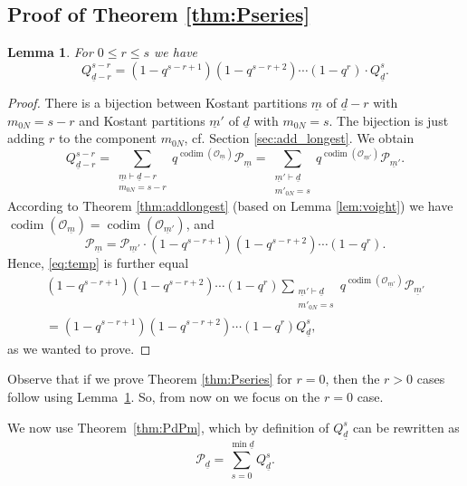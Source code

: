 \documentclass[a4paper]{amsart}
\DeclareMathOperator{\codim}{\mathrm{codim}}
\newcommand{\CO}{\mathcal{O}}
\newcommand{\CP}{\mathcal{P}}
\newcommand{\um}{\underline{m}}
\newcommand{\ud}{\underline{d}}
\newtheorem{lemma}[thm]{Lemma}
\theoremstyle{plain}
\begin{document}
\subsection{Proof of Theorem \ref{thm:Pseries}}
\label{sec:Pseries_proof}

\begin{lemma}\label{lem:shift}
For $0\leq r\leq s$ we have
\[
Q_{\ud-r}^{s-r}= (1-q^{s-r+1})(1-q^{s-r+2})\cdots (1-q^{r}) \cdot Q_{\ud}^{s}.
\]
\end{lemma}

\begin{proof}
There is a bijection between Kostant partitions $\um$ of $\ud-r$ with $m_{0N}=s-r$ and Kostant partitions $\um'$ of $\ud$ with $m_{0N}=s$. The bijection is just adding $r$ to the component $m_{0N}$, cf. Section \ref{sec:add_longest}. We obtain
\begin{equation}\label{eq:temp}
Q_{\ud-r}^{s-r}=
\sum_{\substack{ \um \vdash \ud-r \\ m_{0N}=s-r}} q^{\codim(\CO_{\um})} \CP_{\um} 
=
\sum_{\substack{ \um' \vdash \ud \\ m'_{0N}=s}} q^{\codim(\CO_{\um'})} \CP_{\um'}. 
\end{equation}
According to Theorem \ref{thm:addlongest} (based on Lemma \ref{lem:voight}) we have $\codim(\CO_{\um})=\codim(\CO_{\um'})$, and 
\[
\CP_{\um}=
\CP_{\um'} \cdot (1-q^{s-r+1})(1-q^{s-r+2})\cdots(1-q^r).
\]
Hence, \eqref{eq:temp} is further equal
\begin{multline*}
(1-q^{s-r+1})(1-q^{s-r+2})\cdots(1-q^r) 
\sum_{\substack{ \um' \vdash \ud \\ m'_{0N}=s}} q^{\codim(\CO_{\um'})} \CP_{\um'}
\\=
(1-q^{s-r+1})(1-q^{s-r+2})\cdots(1-q^r) Q_{\ud}^{s},
\end{multline*}
as we wanted to prove.
\end{proof}

Observe that if we prove Theorem \ref{thm:Pseries} for $r=0$, then the $r>0$ cases follow using Lemma~\ref{lem:shift}. So, from now on we focus on the $r=0$ case.

\smallskip

We now use Theorem~\ref{thm:PdPm}, which by definition of $Q^s_{\ud}$ can be rewritten as
\begin{equation}\label{PdQs}
\CP_{\ud}=\sum_{s=0}^{\min \ud} Q_{\ud}^s.
\end{equation}
\end{document}
